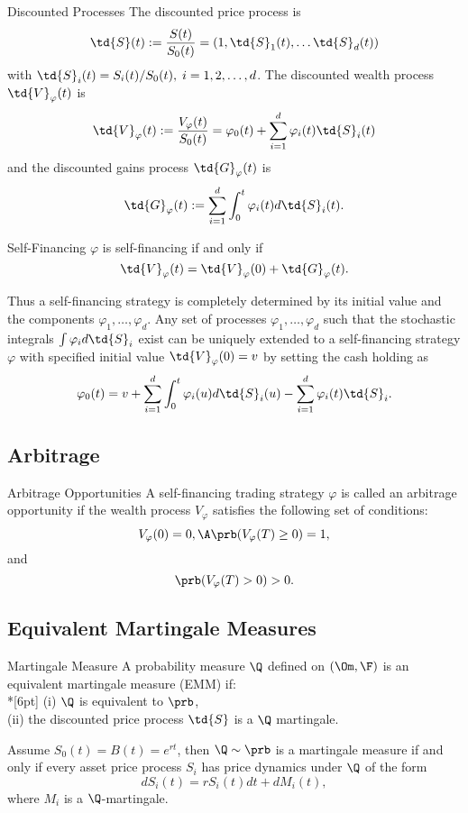 Discounted Processes
	The discounted price process is
		$$
		\td{S}(t) := \frac{S(t)}{S_0(t)} = (1, \td{S}_1(t), \ldots
		\td{S}_d(t))
		$$
	with $\td{S}_i(t) = S_i(t)/S_0(t),\; i=1,2, \ldots, d$. The
	discounted wealth process $\td{V}_\varphi(t)$ is
		$$
		\td{V}_\varphi(t):= \frac{V_\varphi(t)}{S_0(t)} = \varphi_0(t) +
		\sum_{i=1}^d \varphi_i(t) \td{S}_i(t)
		$$
	and the discounted gains process $\td{G}_\varphi(t)$ is
		$$
		\td{G}_\varphi(t) := \sum_{i=1}^d \int_0^t \varphi_i(t)
		d\td{S}_i(t).
		$$


Self-Financing
	$\varphi$ is self-financing if and only if
		$$
		\td{V}_\varphi(t) = \td{V}_\varphi(0) + \td{G}_\varphi(t).
		$$

	Thus a self-financing strategy is completely determined by its
	initial value and the components $\varphi_1, \ldots, \varphi_d$.
	Any set of processes $\varphi_1, \ldots, \varphi_d$
	such that the stochastic integrals $\int \varphi_i d\td{S}_i$
	exist can be uniquely extended to a self-financing strategy
	$\varphi$ with specified initial value $\td{V}_\varphi(0)= v$ by
	setting the cash holding as
		$$
		\varphi_0(t) = v + \sum_{i=1}^d \int_0^t \varphi_i(u) d\td{S}_i(u)
		- \sum_{i=1}^d \varphi_i(t) \td{S}_i.
		$$


\subsection{Arbitrage}
Arbitrage Opportunities
	A self-financing trading strategy $\varphi$ is called an arbitrage
	opportunity if the wealth process $V_\varphi$ satisfies the
	following set of conditions:
		$$
		V_\varphi(0)=0,\A \prb(V_\varphi(T) \geq 0) =1,
		$$
	and
		$$
		\prb(V_\varphi(T) > 0) >0.
		$$


\subsection{Equivalent Martingale Measures}

Martingale Measure
	A probability measure $\Q$ defined on $(\Om,\F)$ is an equivalent
	martingale measure (EMM) if:\\*[6pt]
	(i) $\Q$ is equivalent to $\prb$,\\
	(ii) the discounted price process $\td{S}$ is a $\Q$ martingale.


	Assume $S_0(t) = B(t) = e^{rt}$, then $\Q \sim \prb$ is a
	martingale measure if and only if every asset price process $S_i$
	has price dynamics under $\Q$ of the form
	$$
	dS_i(t) = r S_i(t) dt + dM_i(t),
	$$
	where $M_i$ is a $\Q$-martingale.



